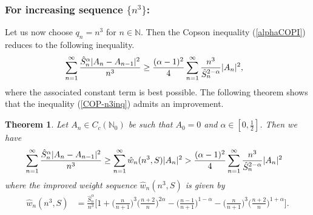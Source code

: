 \documentclass[12pt]{amsart}
\newtheorem{Theorem}{\sc Theorem}[section]
\theoremstyle{definition}
\theoremstyle{plain}
\theoremstyle{definition}
\numberwithin{equation}{section}
\begin{document}
\subsubsection{For increasing sequence $\{n^3\}$:}
Let us now choose $q_n=n^3$ for $n\in \mathbb{N}$. Then the Copson inequality (\ref{alphaCOPI}) reduces to the following inequality.
\begin{align}{\label{COP-n3inq}}
&\displaystyle\sum_{n=1}^{\infty}\frac{\hat{S}_{n}^{\alpha}|A_n-A_{n-1}|^{2}}{n^{3}}\geq
\frac{(\alpha-1)^{2}}{4}\displaystyle\sum_{n=1}^{\infty}\frac{n^{3}}{\hat{S}_{n}^{2-\alpha}}|A_{n}|^{2},
\end{align}where the associated constant term is best possible. The following theorem shows that the inequality (\ref{COP-n3inq}) admits an improvement.
\begin{Theorem}{\label{COP-n3}}
Let $A_{n}\in C_{c}(\mathbb{N}_0)$ be such that $A_{0}=0$ and $\alpha\in[0,\frac{1}{2}]$. Then we have
\begin{align}{\label{COP-n3inqimp}}
&\displaystyle\sum_{n=1}^{\infty}\frac{\hat{S}_{n}^{\alpha}|A_n-A_{n-1}|^{2}}{n^{3}}\geq
\displaystyle\sum_{n=1}^{\infty}\hat{w}_{n}(n^3, S)|A_{n}|^{2}>\frac{(\alpha-1)^{2}}{4}\displaystyle\sum_{n=1}^{\infty}\frac{n^{3}}{\hat{S}_{n}^{2-\alpha}}|A_{n}|^{2}
\end{align}
where the improved weight sequence $\hat{w}_{n}(n^3, S)$ is given by
\begin{align*}
\hat{w}_{n}(n^3, S)& =\frac{\hat{S}_{n}^{\alpha}}{n^{3}}\Big[1+\big(\frac{n}{n+1}\big)^{3}\Big(\frac{n+2}{n}\Big)^{2\alpha}-
\Big(\frac{n-1}{n+1}\Big)^{1-\alpha}-\big(\frac{n}{n+1}\big)^{3}\Big(\frac{n+2}{n}\Big)^{1+\alpha}\Big].
\end{align*}
\end{Theorem}
\end{document}
